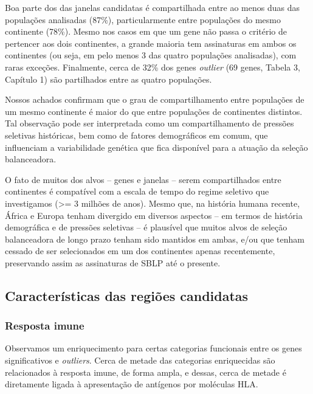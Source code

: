 \begin{refsection}
Boa parte dos das janelas candidatas é compartilhada entre ao menos duas das populações analisadas (87\%), particularmente entre populações do mesmo continente (78\%). Mesmo nos casos em que um gene não passa o critério de pertencer aos dois continentes, a grande maioria tem assinaturas em ambos os continentes (ou seja, em pelo menos 3 das quatro populações analisadas), com raras exceções. Finalmente, cerca de  32\% dos genes \emph{outlier} (69 genes, Tabela 3, Capítulo 1) são partilhados entre as quatro populações. 

Nossos achados confirmam que o grau de compartilhamento entre populações de um mesmo continente é maior do que entre populações de continentes distintos. Tal observação pode ser interpretada como um compartilhamento de pressões seletivas históricas, bem como de fatores demográficos em comum, que influenciam a variabilidade genética que fica disponível para a atuação da seleção balanceadora. 

O fato de muitos dos alvos -- genes e janelas -- serem compartilhados entre continentes é compatível com a escala de tempo do regime seletivo que investigamos (>= 3 milhões de anos). Mesmo que, na história humana recente, África e Europa tenham divergido em diversos aspectos -- em termos de história demográfica e de pressões seletivas -- é plausível  que muitos alvos de seleção balanceadora de longo prazo tenham sido mantidos em ambas, e/ou que tenham cessado de ser selecionados em um dos continentes apenas recentemente, preservando assim as assinaturas de SBLP até o presente.


\subsection{Características das regiões candidatas}
\subsubsection{Resposta imune}

	Observamos um enriquecimento para certas categorias funcionais entre os genes significativos e \emph{outliers}. Cerca de metade das categorias enriquecidas são relacionados à resposta imune, de forma ampla, e dessas, cerca de metade  é diretamente ligada à apresentação de antígenos por moléculas HLA. 


\end{refsection}
